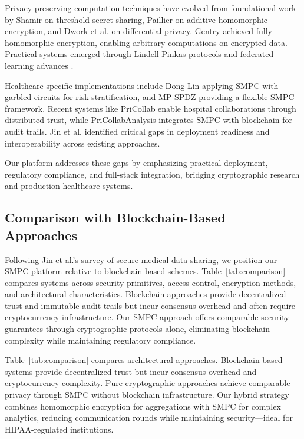 \documentclass[conference]{IEEEtran}
\begin{document}
Privacy-preserving computation techniques have evolved from foundational work by Shamir \cite{shamir1979} on threshold secret sharing, Paillier \cite{paillier1999} on additive homomorphic encryption, and Dwork et al. \cite{dwork2006} on differential privacy. Gentry \cite{gentry2009} achieved fully homomorphic encryption, enabling arbitrary computations on encrypted data. Practical systems emerged through Lindell-Pinkas protocols \cite{lindell2009} and federated learning advances \cite{bonawitz2017,mcmahan2017}.

Healthcare-specific implementations include Dong-Lin \cite{dong2020} applying SMPC with garbled circuits for risk stratification, and MP-SPDZ \cite{keller2020} providing a flexible SMPC framework. Recent systems like PriCollab \cite{sunitha2024} enable hospital collaborations through distributed trust, while PriCollabAnalysis \cite{tawfik2025} integrates SMPC with blockchain for audit trails. Jin et al. \cite{jin2019} identified critical gaps in deployment readiness and interoperability across existing approaches.

Our platform addresses these gaps by emphasizing practical deployment, regulatory compliance, and full-stack integration, bridging cryptographic research and production healthcare systems.

\subsection{Comparison with Blockchain-Based Approaches}
Following Jin et al.'s \cite{jin2019} survey of secure medical data sharing, we position our SMPC platform relative to blockchain-based schemes. Table~\ref{tab:comparison} compares systems across security primitives, access control, encryption methods, and architectural characteristics. Blockchain approaches provide decentralized trust and immutable audit trails but incur consensus overhead and often require cryptocurrency infrastructure. Our SMPC approach offers comparable security guarantees through cryptographic protocols alone, eliminating blockchain complexity while maintaining regulatory compliance.



Table~\ref{tab:comparison} compares architectural approaches. Blockchain-based systems \cite{azaria2016medrec,xia2017bbds,xia2017medshare,fan2018medblock} provide decentralized trust but incur consensus overhead and cryptocurrency complexity. Pure cryptographic approaches \cite{lindell2009,dong2020,keller2020,sunitha2024} achieve comparable privacy through SMPC without blockchain infrastructure. Our hybrid strategy combines homomorphic encryption for aggregations with SMPC for complex analytics, reducing communication rounds while maintaining security—ideal for HIPAA-regulated institutions.
\end{document}
